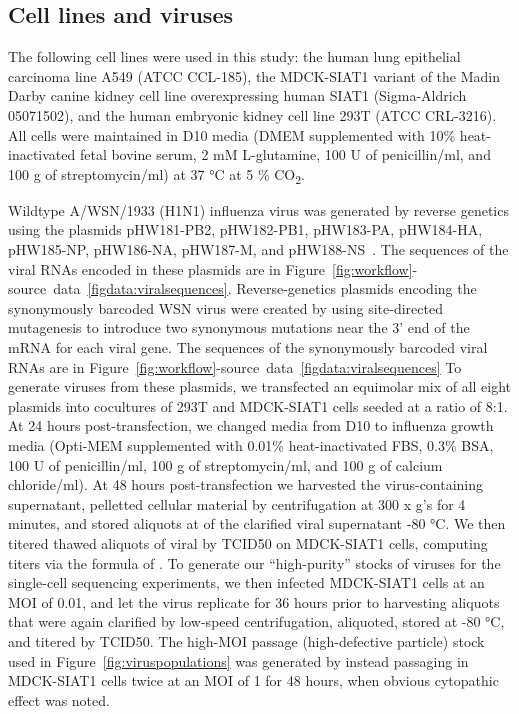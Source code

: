 \documentclass[9pt,lineno]{elife}
\begin{document}
\subsection{Cell lines and viruses}
The following cell lines were used in this study: the human lung epithelial carcinoma line A549 (ATCC CCL-185), the MDCK-SIAT1 variant of the Madin Darby canine kidney cell line overexpressing human SIAT1 (Sigma-Aldrich 05071502), and the human embryonic kidney cell line 293T (ATCC CRL-3216). 
All cells were maintained in D10 media (DMEM supplemented with 10\% heat-inactivated fetal bovine serum, 2 mM L-glutamine, 100 U of penicillin/ml, and 100 \si{\micro}g of streptomycin/ml) at 37 \si{\degreeCelsius} at 5 \% CO\textsubscript{2}.

Wildtype A/WSN/1933 (H1N1) influenza virus was generated by reverse genetics using the plasmids pHW181-PB2, pHW182-PB1, pHW183-PA, pHW184-HA, pHW185-NP, pHW186-NA, pHW187-M, and pHW188-NS~\citep{hoffmann2000dna}.
The sequences of the viral RNAs encoded in these plasmids are in Figure~\ref{fig:workflow}-source~data~\ref{figdata:viralsequences}.
Reverse-genetics plasmids encoding the synonymously barcoded WSN virus were created by using site-directed mutagenesis to introduce two synonymous mutations near the 3' end of the mRNA for each viral gene.
The sequences of the synonymously barcoded viral RNAs are in Figure~\ref{fig:workflow}-source~data~\ref{figdata:viralsequences}
To generate viruses from these plasmids, we transfected an equimolar mix of all eight plasmids into cocultures of 293T and MDCK-SIAT1 cells seeded at a ratio of 8:1. 
At 24 hours post-transfection, we changed media from D10 to influenza growth media (Opti-MEM supplemented with 0.01\% heat-inactivated FBS, 0.3\% BSA, 100 U of penicillin/ml, 100  \si{\micro}g of streptomycin/ml, and 100 \si{\micro}g of calcium chloride/ml).
At 48 hours post-transfection we harvested the virus-containing supernatant, pelletted cellular material by centrifugation at 300 x g's for 4 minutes, and stored aliquots at of the clarified viral supernatant -80 \si{\degreeCelsius }. 
We then titered thawed aliquots of viral by TCID50 on MDCK-SIAT1 cells, computing titers via the formula of \citet{reed1938simple}.
To generate our ``high-purity'' stocks of viruses for the single-cell sequencing experiments, we then infected MDCK-SIAT1 cells at an MOI of 0.01, and let the virus replicate for 36 hours prior to harvesting aliquots that were again clarified by low-speed centrifugation, aliquoted, stored at -80  \si{\degreeCelsius }, and titered by TCID50.
The high-MOI passage (high-defective particle) stock used in Figure~\ref{fig:viruspopulations} was generated by instead passaging in MDCK-SIAT1 cells twice at an MOI of 1 for 48 hours, when obvious cytopathic effect was noted.
\end{document}
